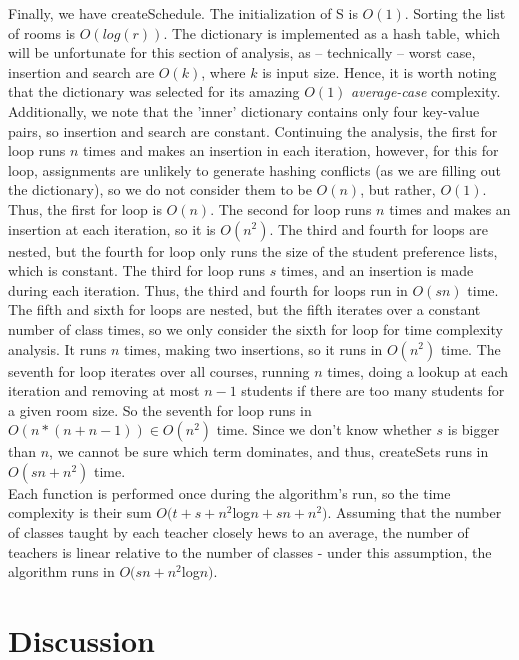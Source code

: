 \documentclass[11pt, oneside]{article}   	%
\begin{document}
 Finally, we have createSchedule. The initialization of S is $O(1)$. Sorting the list of rooms is $O(log(r))$. The dictionary is implemented as a hash table, which will be unfortunate for this section of analysis, as – technically – worst case, insertion and search are $O(k)$, where $k$ is input size. Hence, it is worth noting that the dictionary was selected for its amazing $O(1)$ \textit{average-case} complexity. Additionally, we note that the 'inner' dictionary contains only four key-value pairs, so insertion and search are constant. Continuing the analysis, the first for loop runs $n$ times and makes an insertion in each iteration, however, for this for loop, assignments are unlikely to generate hashing conflicts (as we are filling out the dictionary), so we do not consider them to be $O(n)$, but rather, $O(1)$. Thus, the first for loop is $O(n)$. The second for loop runs $n$ times and makes an insertion at each iteration, so it is $O(n^2)$. The third and fourth for loops are nested, but the fourth for loop only runs the size of the student preference lists, which is constant. The third for loop runs $s$ times, and an insertion is made during each iteration. Thus, the third and fourth for loops run in $O(sn)$ time. The fifth and sixth for loops are nested, but the fifth iterates over a constant number of class times, so we only consider the sixth for loop for time complexity analysis. It runs $n$ times, making two insertions, so it runs in $O(n^2)$ time. The seventh for loop iterates over all courses, running $n$ times, doing a lookup at each iteration and removing at most $n-1$ students if there are too many students for a given room size. So the seventh for loop runs in $O(n*(n+n-1)) \in O(n^2)$ time. Since we don't know whether $s$ is bigger than $n$, we cannot be sure which term dominates, and thus, createSets runs in $O(sn+n^2)$ time. \\
 
 Each function is performed once during the algorithm's run, so the time complexity is their sum $O(t+s+n^2$log$n + sn+n^2)$. Assuming that the number of classes taught by each teacher closely hews to an average, the number of teachers is linear relative to the number of classes - under this assumption, the algorithm runs in $O(sn + n^2$log$n)$. \\

\section{Discussion}
\end{document}
